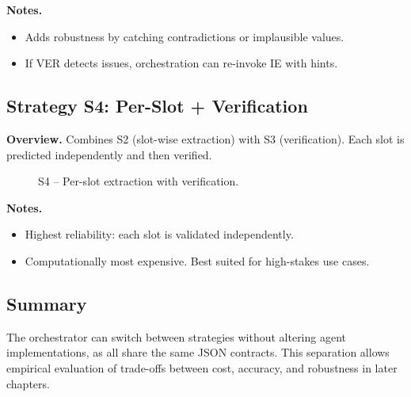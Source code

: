 \textbf{Notes.}  
\begin{itemize}
  \item Adds robustness by catching contradictions or implausible values.  
  \item If VER detects issues, orchestration can re-invoke IE with hints.  
\end{itemize}

\subsection*{Strategy S4: Per-Slot + Verification}

\textbf{Overview.}  
Combines S2 (slot-wise extraction) with S3 (verification). Each slot is predicted independently and then verified.

\begin{figure}[H]
\centering
{}
\caption{S4 – Per-slot extraction with verification.}
\end{figure}

\textbf{Notes.}  
\begin{itemize}
  \item Highest reliability: each slot is validated independently.  
  \item Computationally most expensive. Best suited for high-stakes use cases.  
\end{itemize}

\subsection*{Summary}

The orchestrator can switch between strategies without altering agent implementations, as all share the same JSON contracts. This separation allows empirical evaluation of trade-offs between cost, accuracy, and robustness in later chapters.
